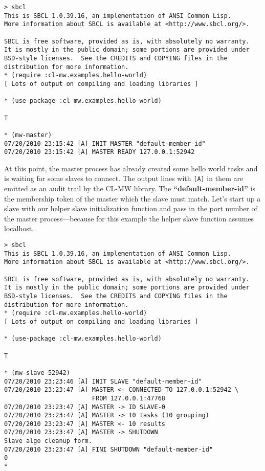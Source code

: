\documentclass[titlepage,12pt]{book}
\newcommand{\xsmall}{\latexhtml{\small}{}}
\newcommand{\xnormalsize}{\latexhtml{\normalsize}{}}
\newcommand{\clmw}{\xsmall\textsc{CL-MW}\xnormalsize\xspace}
\newcommand{\bold}[1]{\textbf{#1}\xspace}
\begin{document}
\small
\begin{verbatim}
> sbcl
This is SBCL 1.0.39.16, an implementation of ANSI Common Lisp.
More information about SBCL is available at <http://www.sbcl.org/>.

SBCL is free software, provided as is, with absolutely no warranty.
It is mostly in the public domain; some portions are provided under
BSD-style licenses.  See the CREDITS and COPYING files in the
distribution for more information.
* (require :cl-mw.examples.hello-world)
[ Lots of output on compiling and loading libraries ]

* (use-package :cl-mw.examples.hello-world)

T

* (mw-master)
07/20/2010 23:15:42 [A] INIT MASTER "default-member-id"
07/20/2010 23:15:42 [A] MASTER READY 127.0.0.1:52942
\end{verbatim}
\normalsize

At this point, the master process has already created some hello
world tasks and is waiting for some slaves to connect. The output
lines with \texttt{[A]} in them are emitted as an audit trail by the
\clmw library.  The \bold{``default-member-id''} is the membership
token of the master which the slave must match. Let's start up a slave
with our helper slave initialization function and pass in the port
number of the master process---because for this example the helper
slave function assumes localhost.

\small
\begin{verbatim}
> sbcl
This is SBCL 1.0.39.16, an implementation of ANSI Common Lisp.
More information about SBCL is available at <http://www.sbcl.org/>.

SBCL is free software, provided as is, with absolutely no warranty.
It is mostly in the public domain; some portions are provided under
BSD-style licenses.  See the CREDITS and COPYING files in the
distribution for more information.
* (require :cl-mw.examples.hello-world)
[ Lots of output on compiling and loading libraries ]

* (use-package :cl-mw.examples.hello-world)

T

* (mw-slave 52942)
07/20/2010 23:23:46 [A] INIT SLAVE "default-member-id"
07/20/2010 23:23:47 [A] MASTER <- CONNECTED TO 127.0.0.1:52942 \
                        FROM 127.0.0.1:47768
07/20/2010 23:23:47 [A] MASTER -> ID SLAVE-0
07/20/2010 23:23:47 [A] MASTER -> 10 tasks (10 grouping)
07/20/2010 23:23:47 [A] MASTER <- 10 results
07/20/2010 23:23:47 [A] MASTER -> SHUTDOWN
Slave algo cleanup form.
07/20/2010 23:23:47 [A] FINI SHUTDOWN "default-member-id"
0
* 
\end{verbatim}
\normalsize
\end{document}
